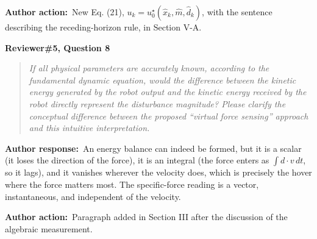 \documentclass[11pt]{article}
\newcommand{\concern}[1]{\par\medskip\noindent\colorbox{gray!12}{\parbox{\dimexpr\linewidth-2\fboxsep}{\textbf{#1}}}\par\smallskip}
\newcommand{\rlabel}[1]{\par\textbf{#1}\ }
\begin{document}
\rlabel{Author action:}New Eq. (21), $u_k = u_0^{\star}(\hat x_k, \hat m, \hat d_k)$, with the sentence describing the receding-horizon rule, in Section V-A.

\concern{Reviewer\#5, Question 8}

\begin{quote}\itshape If all physical parameters are accurately known, according to the fundamental dynamic equation, would the difference between the kinetic energy generated by the robot output and the kinetic energy received by the robot directly represent the disturbance magnitude? Please clarify the conceptual difference between the proposed ``virtual force sensing'' approach and this intuitive interpretation.\end{quote}

\rlabel{Author response:}An energy balance can indeed be formed, but it is a scalar (it loses the direction of the force), it is an integral (the force enters as $\int d \cdot v\,dt$, so it lags), and it vanishes wherever the velocity does, which is precisely the hover where the force matters most. The specific-force reading is a vector, instantaneous, and independent of the velocity.

\rlabel{Author action:}Paragraph added in Section III after the discussion of the algebraic measurement.
\end{document}
